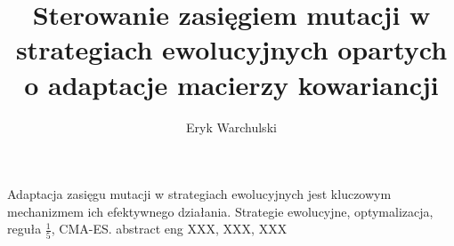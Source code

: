 \documentclass[
    left=2.5cm,         
    right=2.5cm,        
    top=2.5cm,          
    bottom=3cm,         
    bindingoffset=6mm,  
    nohyphenation=false 
]{eiti/eiti-thesis}
\begin{document}

\MasterThesis 
{}
\title{
  Sterowanie zasięgiem mutacji w strategiach ewolucyjnych opartych o
  adaptacje macierzy kowariancji
}
\author{Eryk Warchulski}
\date{\the\year}
\maketitle
\cleardoublepage 


\streszczenie 
  Adaptacja zasięgu mutacji w strategiach ewolucyjnych jest kluczowym mechanizmem ich efektywnego działania.    
\slowakluczowe Strategie ewolucyjne, optymalizacja, reguła $\frac{1}{5}$, CMA-ES.
\newpage
\abstract 
  abstract eng
\keywords XXX, XXX, XXX
\cleardoublepage  
\pagestyle{plain}
\makeauthorship
\cleardoublepage


\tableofcontents
\cleardoublepage 
\pagestyle{headings}









\cleardoublepage 


\printbibliography
\newpage
\pagestyle{plain}
\vspace{0.8cm}


\acronymlist
{}


\listoffigurestoc     
\vspace{1cm}          
\listoftablestoc      
\vspace{1cm}          
\listofappendicestoc  
\end{document}
